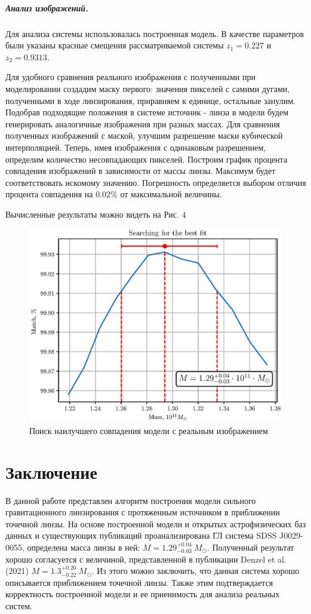 \documentclass[12pt,a4paper]{article}
\begin{document}
\subparagraph*{Анализ изображений.}
Для анализа системы использовалась построенная модель. 
В качестве параметров были указаны красные смещения рассматриваемой системы $z_1 = 0.227$ и $z_2 = 0.9313$.

Для удобного сравнения реального изображения с полученными при моделировании создадим маску первого: значения пикселей с самими дугами, полученными в ходе линзирования, приравняем к единице, остальные занулим.
Подобрав подходящие положения в системе источник - линза в модели будем генерировать аналогичные изображения при разных массах. 
Для сравнения полученных изображений с маской, улучшим разрешение маски кубической интерполяцией. 
Теперь, имея изображения с одинаковым разрешением, определим количество несовпадающих пикселей. 
Построим график процента совпадения изображений в зависимости от массы линзы. 
Максимум будет соответствовать искомому значению. 
Погрешность определяется выбором отличия процента совпадения на $0.02\%$ от максимальной величины.

Вычисленные результаты можно видеть на Рис. 4
\begin{figure}[h]
    \centering
    \includegraphics[width=0.8\linewidth]{sources/resultMass.eps}
    \caption{\small Поиск наилучшего совпадения модели с реальным изображением}
\end{figure}

\section*{Заключение}
В данной работе представлен алгоритм построения модели сильного гравитационного линзирования с протяженным источником в приближении точечной линзы. 
На основе построенной модели и открытых астрофизических баз данных и существующих публикаций проанализирована ГЛ система SDSS J0029-0055, определена масса линзы в ней: $M = 1.29^{+0.04}_{-0.03}\ M_\odot$.
Полученный результат хорошо согласуется с величиной, представленной в публикации Denzel et al. (2021) $M = 1.3^{+0.20}_{-0.22}\ M_\odot$.
Из этого можно заключить, что данная система хорошо описывается приближением точечной линзы.
Также этим подтверждается корректность построенной модели и ее приенимость для анализа реальных систем.
\end{document}
